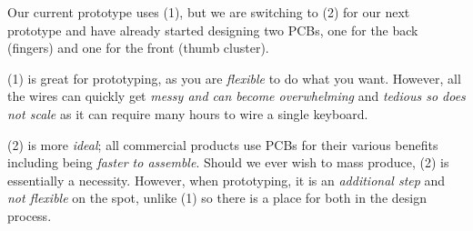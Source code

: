 \documentclass[logo,bsc,singlespacing,parskip]{infthesis}
\begin{document}
Our current prototype uses (1), but we are switching to (2) for our next prototype and have already started designing two PCBs, one for the back (fingers) and one for the front (thumb cluster).

(1) is great for prototyping, as you are \emph{flexible} to do what you want.
However, all the wires can quickly get \emph{messy and can become overwhelming} and \emph{tedious so does not scale} as it can require many hours to wire a single keyboard.

(2) is more \emph{ideal}; all commercial products use PCBs for their various benefits including being \emph{faster to assemble}.
Should we ever wish to mass produce, (2) is essentially a necessity.
However, when prototyping, it is an \emph{additional step} and \emph{not flexible} on the spot, unlike (1) so there is a place for both in the design process.
\end{document}

